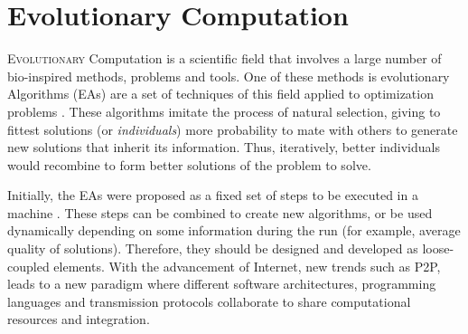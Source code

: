 \section{Evolutionary Computation}
\label{sec:intro:eas}


\lettrine{E}{volutionary} Computation is a scientific field that
involves a large number of bio-inspired methods, problems and
tools. One of these methods is evolutionary Algorithms (EAs) are a set
of techniques of this field applied to optimization problems
\cite{eiben2010whatis}. These algorithms imitate the process of
natural selection, giving to fittest solutions (or {\em individuals})
more probability to mate with others to generate new solutions that
inherit its information. Thus, iteratively, better individuals would
recombine to form better solutions of the problem to solve. %

Initially, the EAs were proposed as a fixed set of steps to be
executed in a machine \cite{eiben2010whatis}. %
These steps can be combined to create new algorithms, or be used %
dynamically  depending on some information during the run (for
example, average quality of solutions). Therefore, they should be
designed and developed as loose-coupled elements. With the advancement
of Internet, new trends such as P2P, leads to a new paradigm where
different software architectures, programming languages and
transmission protocols collaborate to share computational resources
and integration.  

